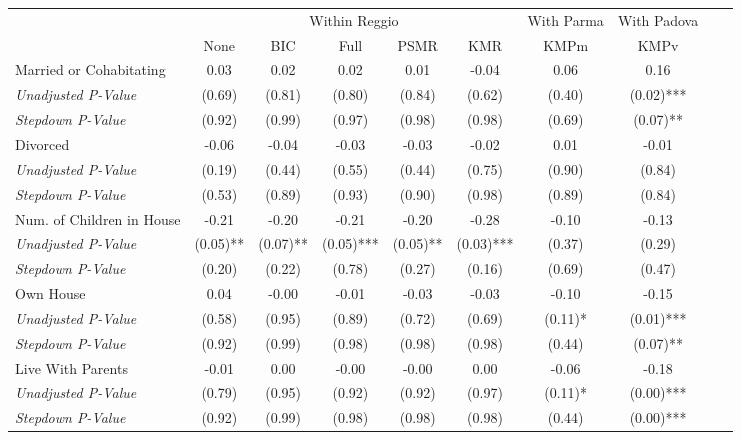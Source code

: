 \begin{tabular}{l c c c c c c c c c}
\toprule
& \multicolumn{5}{c}{Within Reggio} & With Parma & With Padova \\\cmidrule(lr){2-6} \cmidrule(lr){7} \cmidrule(lr){8}
 & None & BIC & Full & PSMR & KMR & KMPm & KMPv \\
\midrule
Married or Cohabitating & 0.03 & 0.02 & 0.02 & 0.01 & -0.04 & 0.06 & 0.16 \\
\quad \textit{Unadjusted P-Value} & (0.69) & (0.81) & (0.80) & (0.84) & (0.62) & (0.40) & (0.02)*** \\
\quad \textit{Stepdown P-Value} & (0.92) & (0.99) & (0.97) & (0.98) & (0.98) & (0.69) & (0.07)** \\
Divorced & -0.06 & -0.04 & -0.03 & -0.03 & -0.02 & 0.01 & -0.01 \\
\quad \textit{Unadjusted P-Value} & (0.19) & (0.44) & (0.55) & (0.44) & (0.75) & (0.90) & (0.84) \\
\quad \textit{Stepdown P-Value} & (0.53) & (0.89) & (0.93) & (0.90) & (0.98) & (0.89) & (0.84) \\
Num. of Children in House & -0.21 & -0.20 & -0.21 & -0.20 & -0.28 & -0.10 & -0.13 \\
\quad \textit{Unadjusted P-Value} & (0.05)** & (0.07)** & (0.05)*** & (0.05)** & (0.03)*** & (0.37) & (0.29) \\
\quad \textit{Stepdown P-Value} & (0.20) & (0.22) & (0.78) & (0.27) & (0.16) & (0.69) & (0.47) \\
Own House & 0.04 & -0.00 & -0.01 & -0.03 & -0.03 & -0.10 & -0.15 \\
\quad \textit{Unadjusted P-Value} & (0.58) & (0.95) & (0.89) & (0.72) & (0.69) & (0.11)* & (0.01)*** \\
\quad \textit{Stepdown P-Value} & (0.92) & (0.99) & (0.98) & (0.98) & (0.98) & (0.44) & (0.07)** \\
Live With Parents & -0.01 & 0.00 & -0.00 & -0.00 & 0.00 & -0.06 & -0.18 \\
\quad \textit{Unadjusted P-Value} & (0.79) & (0.95) & (0.92) & (0.92) & (0.97) & (0.11)* & (0.00)*** \\
\quad \textit{Stepdown P-Value} & (0.92) & (0.99) & (0.98) & (0.98) & (0.98) & (0.44) & (0.00)*** \\
\bottomrule
\end{tabular}
